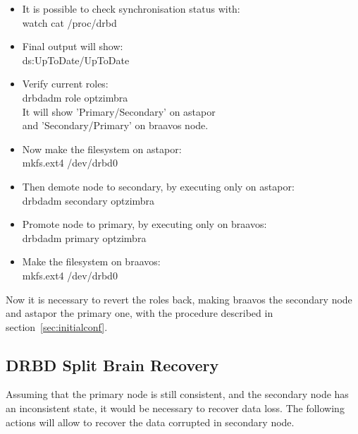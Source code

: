 \documentclass[a4paper, 12pt]{book}
\begin{document}
\begin{itemize}
	\item It is possible to check synchronisation status with:\\
		watch cat /proc/drbd

	\item Final output will show:\\
		ds:UpToDate/UpToDate

	\item Verify current roles:\\
		drbdadm role optzimbra\\
		It will show 'Primary/Secondary' on astapor \\
		and 'Secondary/Primary' on braavos node.

	\item Now make the filesystem on astapor:\\
		mkfs.ext4 /dev/drbd0

	\item Then demote node to secondary, by executing only on astapor:\\
		drbdadm secondary optzimbra

	\item Promote node to primary, by executing only on braavos:\\
		drbdadm primary optzimbra

	\item Make the filesystem on braavos:\\
		mkfs.ext4 /dev/drbd0

\end{itemize}

\noindent Now it is necessary to revert the roles back, making braavos the secondary node and astapor the primary one, with the procedure described in section~\ref{sec:initialconf}.


\subsection{DRBD Split Brain Recovery}
\label{sec:splitbrain}

\noindent Assuming that the primary node is still consistent, and the secondary node has an inconsistent state, it would be necessary to recover data loss. The following actions will allow to recover the data corrupted in secondary node.
\end{document}
